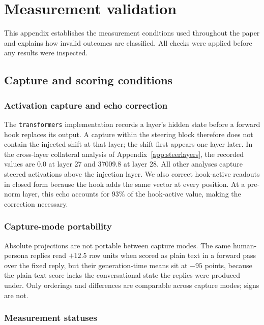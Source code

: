 \section{Measurement validation}
\label{app:methods}

This appendix establishes the measurement conditions used throughout the paper
and explains how invalid outcomes are classified. All checks were applied
before any results were inspected.

\subsection{Capture and scoring conditions}

\subsubsection{Activation capture and echo correction}

The \texttt{transformers}
implementation records a layer's hidden state before a forward hook replaces
its output. A capture within the steering block therefore does not contain the
injected shift at that layer; the shift first appears one layer later. In the
cross-layer collateral analysis of Appendix~\ref{app:steerlayers}, the
recorded values are 0.0 at layer 27 and 37009.8 at
layer 28. All other analyses capture steered activations above the injection
layer. We also correct hook-active readouts in closed form because the
hook adds the same vector at every position. At a pre-norm layer, this echo
accounts for 93\% of the hook-active value, making the correction necessary.

\subsubsection{Capture-mode portability}

Absolute projections are not
portable between capture modes. The same human-persona replies read $+12.5$ raw
units when scored as plain text in a forward pass over the fixed reply, but their
generation-time means sit at $-95$ points, because the plain-text score lacks the
conversational state the replies were produced under. Only orderings and
differences are comparable across capture modes; signs are not.

\subsubsection{Measurement statuses}

